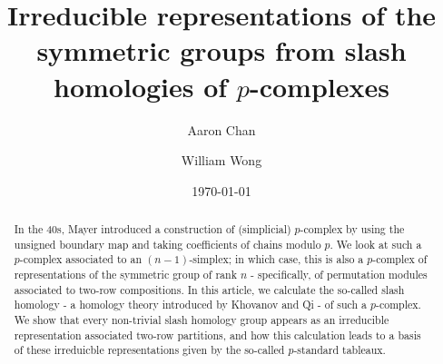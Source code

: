 \documentclass[a4paper]{amsart}
\numberwithin{equation}{subsection}
\theoremstyle{definition}
\numberwithin{equation}{subsection}
\begin{document}
\title[Irreducible representations of the symmetric groups from slash homologies]{Irreducible representations of the symmetric groups from slash homologies of $p$-complexes}
\date{\today}



\author{Aaron Chan}
\address{Graduate School of Mathematics, Nagoya University, Furocho, Chikusaku, Nagoya, JAPAN}

\author{William Wong}
\address{Graduate School of Mathematics, Nagoya University, Furocho, Chikusaku, Nagoya, JAPAN}

\begin{abstract}
In the 40s, Mayer introduced a construction of (simplicial) $p$-complex by using the unsigned boundary map and taking coefficients of chains modulo $p$.
We look at such a $p$-complex associated to an $(n-1)$-simplex; in which case, this is also a $p$-complex of representations of the symmetric group of rank $n$ - specifically, of permutation modules associated to two-row compositions.
In this article, we calculate the so-called slash homology - a homology theory introduced by Khovanov and Qi - of such a $p$-complex.
We show that every non-trivial slash homology group appears as an irreducible representation associated two-row partitions, and how this calculation leads to a basis of these irreduicble representations given by the so-called $p$-standard tableaux.
\end{abstract}


\maketitle

\end{document}
